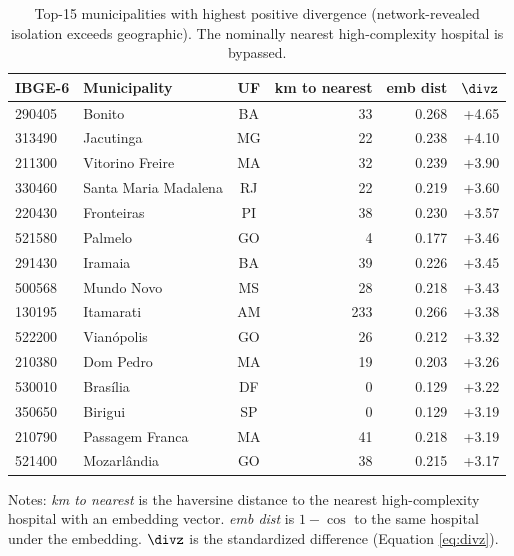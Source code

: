 \begin{table}[ht]
\centering
\caption{Top-15 municipalities with highest positive divergence (network-revealed isolation exceeds geographic). The nominally nearest high-complexity hospital is bypassed.}
\label{tab:top15-pos}
\small
\begin{tabular}{llcrrr}
\toprule
IBGE-6 & Municipality & UF & km to nearest & emb dist & $\divz$ \\
\midrule
  290405 & Bonito & BA & 33 & 0.268 & +4.65 \\
  313490 & Jacutinga & MG & 22 & 0.238 & +4.10 \\
  211300 & Vitorino Freire & MA & 32 & 0.239 & +3.90 \\
  330460 & Santa Maria Madalena & RJ & 22 & 0.219 & +3.60 \\
  220430 & Fronteiras & PI & 38 & 0.230 & +3.57 \\
  521580 & Palmelo & GO & 4 & 0.177 & +3.46 \\
  291430 & Iramaia & BA & 39 & 0.226 & +3.45 \\
  500568 & Mundo Novo & MS & 28 & 0.218 & +3.43 \\
  130195 & Itamarati & AM & 233 & 0.266 & +3.38 \\
  522200 & Vianópolis & GO & 26 & 0.212 & +3.32 \\
  210380 & Dom Pedro & MA & 19 & 0.203 & +3.26 \\
  530010 & Brasília & DF & 0 & 0.129 & +3.22 \\
  350650 & Birigui & SP & 0 & 0.129 & +3.19 \\
  210790 & Passagem Franca & MA & 41 & 0.218 & +3.19 \\
  521400 & Mozarlândia & GO & 38 & 0.215 & +3.17 \\
\bottomrule
\end{tabular}
\medskip

\footnotesize
Notes: \textit{km to nearest} is the haversine distance to the nearest high-complexity hospital with an embedding vector. \textit{emb dist} is $1 - \cos$ to the same hospital under the embedding. $\divz$ is the standardized difference (Equation \ref{eq:divz}).
\end{table}
